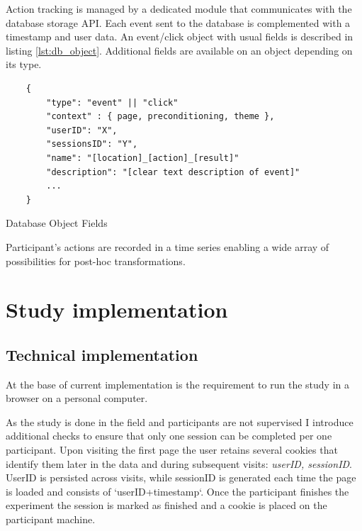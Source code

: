 		
		Action tracking is managed by a dedicated module that communicates with the database storage API. Each event sent to the database is complemented with a timestamp and user data. An event/click object with usual fields is described in listing \ref{lst:db_object}. Additional fields are available on an object depending on its type.

	\begin{listing}[h]
		\begin{verbatim}
	{
		"type": "event" || "click"
		"context" : { page, preconditioning, theme },
		"userID": "X",
		"sessionsID": "Y",
		"name": "[location]_[action]_[result]"
		"description": "[clear text description of event]"
		...
	}
		\end{verbatim}
		\caption{Database Object Fields}
		\label{lst:db_object}
	\end{listing}

		Participant's actions are recorded in a time series enabling a wide array of possibilities for post-hoc transformations.
		
		

\section{Study implementation}



\subsection{Technical implementation} \label{sec:study_technical_implementation}
At the base of current implementation is the requirement to run the study in a browser on a personal computer. 

As the study is done in the field and participants are not supervised I introduce additional checks to ensure that only one session can be completed per one participant. Upon visiting the first page the user retains several cookies that identify them later in the data and during subsequent visits: \textit{userID, sessionID}. UserID is persisted across visits, while sessionID is generated each time the page is loaded and consists of `userID+timestamp`. Once the participant finishes the experiment the session is marked as finished and a cookie is placed on the participant machine.

